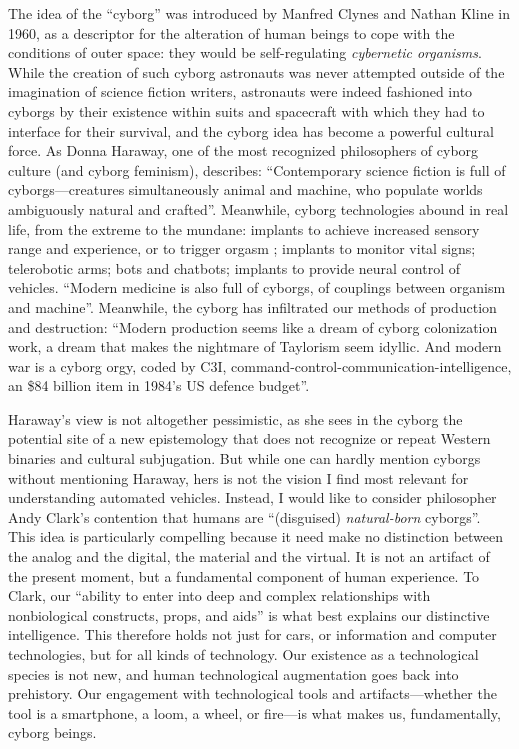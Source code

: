 The idea of the ``cyborg'' was introduced by Manfred Clynes and Nathan
Kline in 1960, as a descriptor for the alteration of human beings to
cope with the conditions of outer space: they would be self-regulating
\emph{cybernetic organisms}\cite[p. 66]{ekbia}. While the creation of
such cyborg astronauts was never attempted outside of the imagination
of science fiction writers, astronauts were indeed fashioned into
cyborgs by their existence within suits and spacecraft with which they
had to interface for their survival, and the cyborg idea has become a
powerful cultural force. As Donna Haraway, one of the most recognized
philosophers of cyborg culture (and cyborg feminism), describes:
``Contemporary science 
fiction is full of cyborgs---creatures simultaneously
animal and machine, who populate worlds ambiguously natural and
crafted''\cite[p. 117]{???-haraway}. Meanwhile, cyborg technologies
abound in real life, from the extreme to the mundane: implants to
achieve increased sensory range and experience, or to trigger orgasm
\cite[p. 64]{ekbia}; implants to monitor vital signs; telerobotic
arms; bots and chatbots; implants to provide neural control of
vehicles\cite[p. 65]{ekbia}. ``Modern medicine is also full of
cyborgs, of couplings between organism
and machine''\cite[p. 117]{???-haraway}. Meanwhile, the cyborg has
infiltrated our methods of production and destruction: ``Modern
production seems like a dream of cyborg colonization work, a dream
that makes the nightmare of Taylorism seem idyllic. And modern war is
a cyborg orgy, coded by C3I,
command-control-communication-intelligence, an \$84 billion item in 1984's US
defence budget''\cite[p. 118]{???-haraway}. 

Haraway's view is not altogether pessimistic, as she sees in the cyborg
the potential site of a new epistemology that does not recognize or
repeat Western binaries and cultural subjugation\cite[p.
  118-121]{???-haraway}. But while one can hardly mention cyborgs without
mentioning Haraway, hers is not the vision I find most relevant for
understanding automated vehicles. Instead, I would like to consider philosopher Andy
Clark's contention that humans are ``(disguised) \emph{natural-born}
cyborgs''\cite[p. 66]{ekbia}. This idea is particularly compelling
because it need make no distinction between the analog and the
digital, the material and the virtual. It is not an artifact of the
present moment, but a fundamental component of human experience. To
Clark, our ``ability to enter into deep and complex relationships with
nonbiological constructs, props, and aids'' is what best explains our
distinctive intelligence\cite[p. 66-67]{ekbia}. This therefore holds
not just for cars, or information and computer technologies, but for
all kinds of technology. Our existence as a technological species is
not new, and human technological augmentation goes back into
prehistory. Our engagement with technological tools and
artifacts---whether the tool is a smartphone, a loom, a wheel, or
fire---is what makes us, fundamentally, cyborg beings. 

